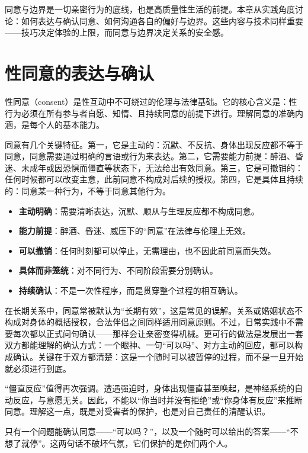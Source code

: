 \documentclass[12pt,UTF8]{ctexbook}
\newcommand{\keyword}[1]{\textbf{#1}}
\begin{document}
同意与边界是一切亲密行为的底线，也是高质量性生活的前提。本章从实践角度讨论：如何表达与确认同意、如何沟通各自的偏好与边界。这些内容与技术同样重要——技巧决定体验的上限，而同意与边界决定关系的安全感。
\section{性同意的表达与确认}

性同意（consent）是性互动中不可绕过的伦理与法律基础。它的核心含义是：性行为必须在所有参与者自愿、知情、且持续同意的前提下进行。理解同意的准确内涵，是每个人的基本能力。

同意有几个关键特征。第一，它是主动的：沉默、不反抗、身体出现反应都不等于同意，同意需要通过明确的言语或行为来表达。第二，它需要能力前提：醉酒、昏迷、未成年或因恐惧而僵直等状态下，无法给出有效同意。第三，它是可撤销的：任何时候都可以改变主意，此前同意不构成对后续的授权。第四，它是具体且持续的：同意某一种行为，不等于同意其他行为。

\begin{itemize}
  \item \keyword{主动明确}：需要清晰表达，沉默、顺从与生理反应都不构成同意。
  \item \keyword{能力前提}：醉酒、昏迷、威压下的“同意”在法律与伦理上无效。
  \item \keyword{可以撤销}：任何时刻都可以停止，无需理由，也不因此前同意而失效。
  \item \keyword{具体而非笼统}：对不同行为、不同阶段需要分别确认。
  \item \keyword{持续确认}：不是一次性程序，而是贯穿整个过程的相互确认。
\end{itemize}

在长期关系中，同意常被默认为“长期有效”，这是常见的误解。关系或婚姻状态不构成对身体的概括授权，合法伴侣之间同样适用同意原则。不过，日常实践中不需要每次都以正式问句确认——那样会让亲密变得机械。更可行的做法是发展出一套双方都能理解的确认方式：一个眼神、一句“可以吗”、对方主动的回应，都可以构成确认。关键在于双方都清楚：这是一个随时可以被暂停的过程，而不是一旦开始就必须进行到底。

“僵直反应”值得再次强调。遭遇强迫时，身体出现僵直甚至唤起，是神经系统的自动反应，与意愿无关。因此，不能以“你当时并没有拒绝”或“你身体有反应”来推断同意。理解这一点，既是对受害者的保护，也是对自己责任的清醒认识。

\begin{tcolorbox}[colback=pink!5!white,colframe=red!50!black,title=贴心小叮咛]
只有一个问题能确认同意——“可以吗？”，以及一个随时可以给出的答案——“不想了就停”。这两句话不破坏气氛，它们保护的是你们两个人。
\end{tcolorbox}
\end{document}
